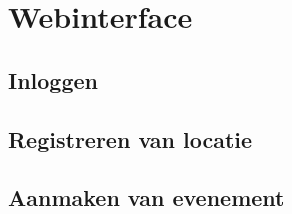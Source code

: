 
\section{Webinterface}%
\subsection{Inloggen}
\subsection{Registreren van locatie}
\subsection{Aanmaken van evenement}


